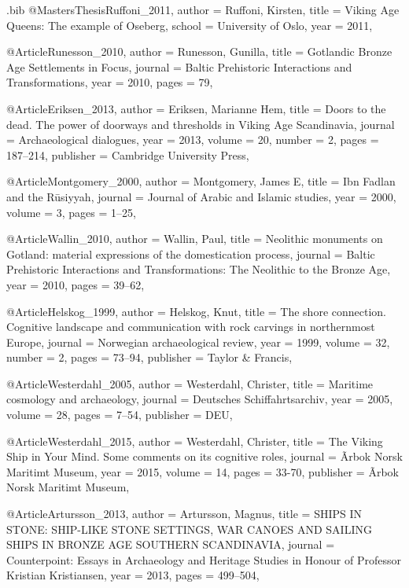 \begin{filecontents}{\IJSRAidentifier.bib}
@MastersThesis{Ruffoni_2011,
	author = {Ruffoni, Kirsten},
	title  = {Viking Age Queens: The example of Oseberg},
	school = {University of Oslo},
	year   = {2011},
}

@Article{Runesson_2010,
	author  = {Runesson, Gunilla},
	title   = {Gotlandic Bronze Age Settlements in Focus},
	journal = {Baltic Prehistoric Interactions and Transformations},
	year    = {2010},
	pages   = {79},
}

@Article{Eriksen_2013,
	author    = {Eriksen, Marianne Hem},
	title     = {Doors to the dead. The power of doorways and thresholds in Viking Age Scandinavia},
	journal   = {Archaeological dialogues},
	year      = {2013},
	volume    = {20},
	number    = {2},
	pages     = {187--214},
	publisher = {Cambridge University Press},
}

@Article{Montgomery_2000,
	author  = {Montgomery, James E},
	title   = {Ibn Fadlan and the R{\=u}siyyah},
	journal = {Journal of Arabic and Islamic studies},
	year    = {2000},
	volume  = {3},
	pages   = {1--25},
}

@Article{Wallin_2010,
	author  = {Wallin, Paul},
	title   = {Neolithic monuments on Gotland: material expressions of the domestication process},
	journal = {Baltic Prehistoric Interactions and Transformations: The Neolithic to the Bronze Age},
	year    = {2010},
	pages   = {39--62},
}

@Article{Helskog_1999,
	author    = {Helskog, Knut},
	title     = {The shore connection. Cognitive landscape and communication with rock carvings in northernmost Europe},
	journal   = {Norwegian archaeological review},
	year      = {1999},
	volume    = {32},
	number    = {2},
	pages     = {73--94},
	publisher = {Taylor \& Francis},
}

@Article{Westerdahl_2005,
	author    = {Westerdahl, Christer},
	title     = {Maritime cosmology and archaeology},
	journal   = {Deutsches Schiffahrtsarchiv},
	year      = {2005},
	volume    = {28},
	pages     = {7--54},
	publisher = {DEU},
}

@Article{Westerdahl_2015,
	author    = {Westerdahl, Christer},
	title     = {The Viking Ship in Your Mind. Some comments on its cognitive roles},
	journal   = {Ãrbok Norsk Maritimt Museum},
	year      = {2015},
	volume    = {14},
	pages     = {33-70},
	publisher = {Ãrbok Norsk Maritimt Museum},
}

@Article{Artursson_2013,
	author  = {Artursson, Magnus},
	title   = {SHIPS IN STONE: SHIP-LIKE STONE SETTINGS, WAR CANOES AND SAILING SHIPS IN BRONZE AGE SOUTHERN SCANDINAVIA},
	journal = {Counterpoint: Essays in Archaeology and Heritage Studies in Honour of Professor Kristian Kristiansen},
	year    = {2013},
	pages   = {499--504},
}


\end{filecontents}
